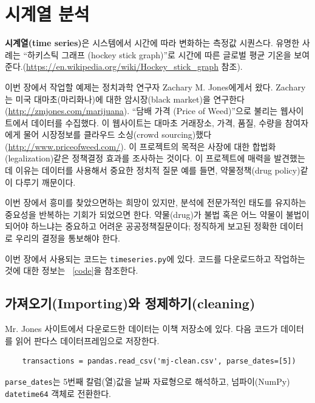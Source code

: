 
\chapter{시계열 분석}

{\bf 시계열(time series)}은 시스템에서 시간에 따라 변화하는 측정값 시퀀스다. 
유명한 사례는 ``하키스틱 그래프 (hockey stick graph)''로 시간에 따른 글로벌 평균 기온을 보여준다.(\url{https://en.wikipedia.org/wiki/Hockey_stick_graph} 참조).

이번 장에서 작업할 예제는 정치과학 연구자 Zachary M. Jones에게서 왔다. 
Zachary는 미국 대마초(마리화나)에 대한 암시장(black market)을 연구한다(\url{http://zmjones.com/marijuana}). ``담배 가격 (Price of Weed)''으로 불리는 웹사이트에서 데이터를 수집했다. 이 웹사이트는 대마초 거래장소, 가격, 품질, 수량을 참여자에게 물어 시장정보를 클라우드 소싱(crowd sourcing)했다(\url{http://www.priceofweed.com/}).
이 프로젝트의 목적은 사장에 대한 합법화(legalization)같은 정책결정 효과를 조사하는 것이다. 이 프로젝트에 매력을 발견했는데 이유는 데이터를 사용해서 중요한 정치적 질문 예를 들면, 약물정책(drug policy)같이 다루기 깨문이다.


이번 장에서 흥미를 찾았으면하는 희망이 있지만, 분석에 전문가적인 태도를 유지하는 중요성을 반복하는 기회가 되었으면 한다. 약물(drug)가 불법 혹은 어느 약물이 불법이 되어야 하느냐는 중요하고 어려운 공공정책질문이다; 정직하게 보고된 정확한 데이터로 우리의 결정을 통보해야 한다.


이번 장에서 사용되는 코드는 {\tt timeseries.py}에 있다.
코드를 다운로드하고 작업하는 것에 대한 정보는 ~\ref{code}을 참조한다.

\section{가져오기(Importing)와 정제하기(cleaning)}

Mr. Jones 사이트에서 다운로드한 데이터는 이책 저장소에 있다.
다음 코드가 데이터를 읽어 판다스 데이터프레임으로 저장한다.

\begin{verbatim}
    transactions = pandas.read_csv('mj-clean.csv', parse_dates=[5])
\end{verbatim}

\verb"parse_dates"는 5번째 칼럼(열)값을 날짜 자료형으로 해석하고, 
넘파이(NumPy) {\tt datetime64} 객체로 전환한다.

